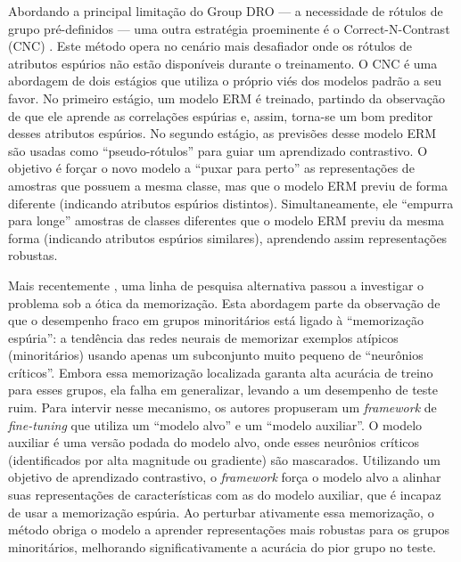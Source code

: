 Abordando a principal limitação do Group DRO — a necessidade de rótulos de grupo pré-definidos — uma outra estratégia proeminente é o Correct-N-Contrast (CNC) \cite{cnc}. Este método opera no cenário mais desafiador onde os rótulos de atributos espúrios não estão disponíveis durante o treinamento. O CNC é uma abordagem de dois estágios  que utiliza o próprio viés dos modelos padrão a seu favor. No primeiro estágio, um modelo ERM é treinado, partindo da observação de que ele aprende as correlações espúrias e, assim, torna-se um bom preditor desses atributos espúrios. No segundo estágio, as previsões desse modelo ERM são usadas como ``pseudo-rótulos'' para guiar um aprendizado contrastivo. O objetivo é forçar o novo modelo a ``puxar para perto'' as representações de amostras que possuem a mesma classe, mas que o modelo ERM previu de forma diferente (indicando atributos espúrios distintos). Simultaneamente, ele ``empurra para longe'' amostras de classes diferentes que o modelo ERM previu da mesma forma (indicando atributos espúrios similares), aprendendo assim representações robustas.

Mais recentemente \cite{memorization}, uma linha de pesquisa alternativa passou a investigar o problema sob a ótica da memorização. Esta abordagem parte da observação de que o desempenho fraco em grupos minoritários está ligado à ``memorização espúria'': a tendência das redes neurais de memorizar exemplos atípicos (minoritários) usando apenas um subconjunto muito pequeno de ``neurônios críticos''. Embora essa memorização localizada garanta alta acurácia de treino para esses grupos, ela falha em generalizar, levando a um desempenho de teste ruim. Para intervir nesse mecanismo, os autores propuseram um \textit{framework} de \textit{fine-tuning} que utiliza um ``modelo alvo'' e um ``modelo auxiliar''. O modelo auxiliar é uma versão podada do modelo alvo, onde esses neurônios críticos (identificados por alta magnitude ou gradiente) são mascarados. Utilizando um objetivo de aprendizado contrastivo, o \textit{framework} força o modelo alvo a alinhar suas representações de características com as do modelo auxiliar, que é incapaz de usar a memorização espúria. Ao perturbar ativamente essa memorização, o método obriga o modelo a aprender representações mais robustas para os grupos minoritários, melhorando significativamente a acurácia do pior grupo no teste.